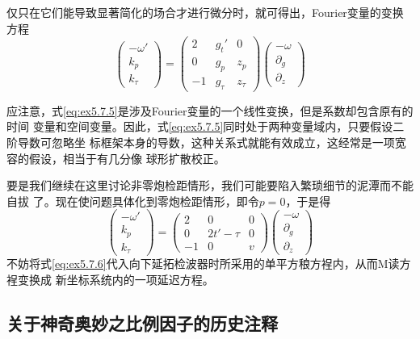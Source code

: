 仅只在它们能导致显著简化的场合才进行微分时，就可得出，Fourier变量的变换方程
\begin{equation}
\begin{pmatrix}
-\omega ' \\
k_p \\
k_\tau
\end{pmatrix}=
\begin{pmatrix}
2 & g_t' & 0\\
0 & g_p  & z_p \\
-1 & g_\tau & z_\tau 
\end{pmatrix}
\begin{pmatrix}
-\omega \\
\partial_g \\
\partial_z
\end{pmatrix}
\label{eq:ex5.7.5}
\end{equation}

应注意，式\ref{eq:ex5.7.5}是涉及Fourier变量的一个线性变换，但是系数却包含原有的时间
变量和空间变量。因此，式\ref{eq:ex5.7.5}同时处于两种变量域内，只要假设二阶导数可忽略坐
标框架本身的导数，这种关系式就能有效成立，这经常是一项宽容的假设，相当于有几分像
球形扩散校正。

要是我们继续在这里讨论非零炮检距情形，我们可能要陷入繁琐细节的泥潭而不能自拔
了。现在使问题具体化到零炮检距情形，即令$p=0$，于是得
\begin{equation}
\begin{pmatrix}
-\omega ' \\
k_p \\
k_\tau
\end{pmatrix}=
\begin{pmatrix}
2 & 0 & 0\\
0 & 2t'-\tau  & 0 \\
-1 & 0 & v 
\end{pmatrix}
\begin{pmatrix}
-\omega \\
\partial_g \\
\partial_z
\end{pmatrix}
\label{eq:ex5.7.6}
\end{equation}
不妨将式\ref{eq:ex5.7.6}代入向下延拓检波器时所采用的单平方稂方裎内，从而M读方裎变换成
新坐标系统内的一项延迟方程。

\subsection{关于神奇奥妙之比例因子的历史注释}
\label{sec:5.7.4}

